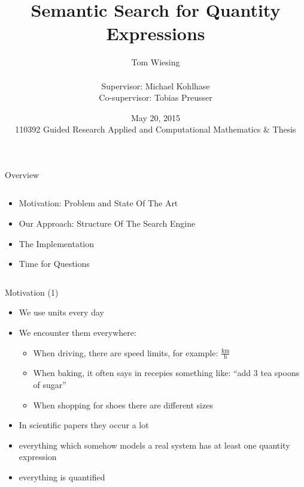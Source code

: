 \documentclass{beamer}
\title{Semantic Search for Quantity Expressions}
\author{Tom Wiesing\\\ \\Supervisor: Michael Kohlhase\\Co-supervisor: Tobias Preusser}
\date{May 20, 2015 \\110392 Guided Research Applied and Computational Mathematics \& Thesis}
\begin{document}
  \frame{\titlepage}

  \begin{frame}{Overview}
    \pause
    \begin{columns}[T]
      \begin{column}[T]{7cm}
        \begin{itemize}[<+->]
          \item Motivation: Problem and State Of The Art
          \item Our Approach: Structure Of The Search Engine
          \item The Implementation
          \item Time for Questions
        \end{itemize}
      \end{column}
    \end{columns}
  \end{frame}

  \begin{frame}{Motivation (1)}
    \begin{itemize}[<+->]
      \item We use units every day
      \item We encounter them everywhere:
      \begin{itemize}[<+->]
        \item When driving, there are speed limits, for example:  $\frac{\text{km}}{\text{h}}$ %
        \item When baking, it often says in recepies something like: ``add 3 tea spoons of sugar''
        \item When shopping for shoes there are different sizes
      \end{itemize}
      \item In scientific papers they occur a lot
      \item everything which somehow models a real system has at least one quantity expression
      \item everything is quantified
    \end{itemize}
  \end{frame}
\end{document}
